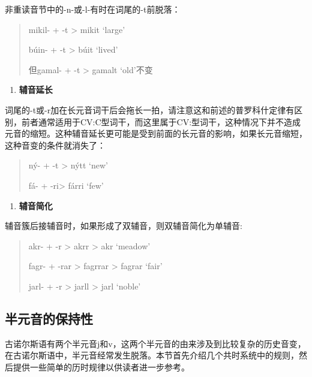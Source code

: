 非重读音节中的-n-或-l-有时在词尾的-t前脱落：

\begin{quote}
  mikil- + -t \textgreater{} mikit `large'

  búin- + -t \textgreater{} búit `lived'

  但gamal- + -t \textgreater{} gamalt `old'不变
\end{quote}

\begin{enumerate}
  \def\labelenumi{\Alph{enumi}.}
  \setcounter{enumi}{3}
  \item
        \label{_Ref116211616}{}\textbf{辅音延长}
\end{enumerate}

词尾的-t或-r加在长元音词干后会拖长一拍，请注意这和前述的普罗科什定律有区别，前者通常适用于CV:C型词干，而这里属于CV:型词干，这种情况下并不造成元音的缩短。这种辅音延长更可能是受到前面的长元音的影响，如果长元音缩短，这种音变的条件就消失了：

\begin{quote}
  ný- + -t \textgreater{} nýtt `new'

  fá- + -ri\textgreater{} fárri `few'
\end{quote}

\begin{enumerate}
  \def\labelenumi{\Alph{enumi}.}
  \setcounter{enumi}{4}
  \item
        \label{_Ref115765758}{}\textbf{辅音简化}
\end{enumerate}

辅音簇后接辅音时，如果形成了双辅音，则双辅音简化为单辅音:

\begin{quote}
  akr- + -r \textgreater{} akrr \textgreater{} akr `meadow'

  fagr- + -rar \textgreater{} fagrrar \textgreater{} fagrar `fair'

  jarl- + -r \textgreater{} jarll \textgreater{} jarl `noble'
\end{quote}

\subsection{半元音的保持性}\label{半元音的保持性}

古诺尔斯语有两个半元音j和v，这两个半元音的由来涉及到比较复杂的历史音变，在古诺尔斯语中，半元音经常发生脱落。本节首先介绍几个共时系统中的规则，然后提供一些简单的历时规律以供读者进一步参考。


